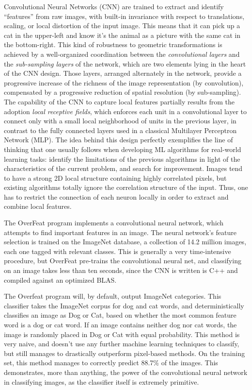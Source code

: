 \documentclass[12pt]{article}
\begin{document}
Convolutional Neural Networks (CNN) are trained to extract and identify ``features'' from raw images, with built-in invariance with respect to translations, scaling, or local distortion of the input image. This means that it can pick up a cat in the upper-left and know it's the animal as a picture with the same cat in the bottom-right. This kind of robustness to geometric transformations is achieved by a well-organized coordination between the \emph{convolutional layers} and the \emph{sub-sampling layers} of the network, which are two elements lying in the heart of the CNN design. Those layers, arranged alternately in the network, provide a progressive increase of the richness of the image representation (by convolution), compensated by a progressive reduction of spatial resolution (by sub-sampling). The capability of the CNN to capture local features partially results from the adoption \emph{local receptive fields}, which enforces each unit in a convolutional layer to connect only with a small local neighborhood of units in the previous layer, in contrast to the fully connected layers used in a classical Multilayer Perceptron Network (MLP). The idea behind this design perfectly exemplifies the line of thinking that one usually follows when developing ML algorithms for real-world learning tasks: identify the limitations of the previous algorithms in light of the characteristics of the current problem, and search for improvement. Images tend to have a strong 2D local structure containing highly correlated pixels, but existing algorithms totally ignore the correlation structure of the input. Thus, one has to restrict the connection of each neuron locally in order to extract and combine local features.

The OverFeat program implements a convolutional neural network, which attempts to find important features in an image. The neural network's feature selection is trained on the ImageNet database, a collection of 14.2 million images, each one tagged with relevant classes. This is generally a very time-intensive procedure, but OverFeat pre-trains the convolutional neural net, and classifying on an image takes less than ten seconds, since the CNN is written is C++ and compiled against an optimized BLAS.

The Overfeat program will, by default, output ImageNet categories. This classifier takes the ImageNet corpus for dog and cat words, and deterministically classifies an image as Dog or Cat, based on whether the most common feature word is a dog or cat word. If an image contains neither dog nor cat words, the image is randomly placed in Dog or Cat with equal probability. This method is very naive, and doesn't use any further machine learning techniques to classify, but still manages to drastically outperform pixel-based methods. On the training set, this method manages to correctly predict 88.7\% of the images. This demonstrates, more than anything, the power of the convolutional neural network in classifying images, as the classifier itself is extremely primitive.
\end{document}
